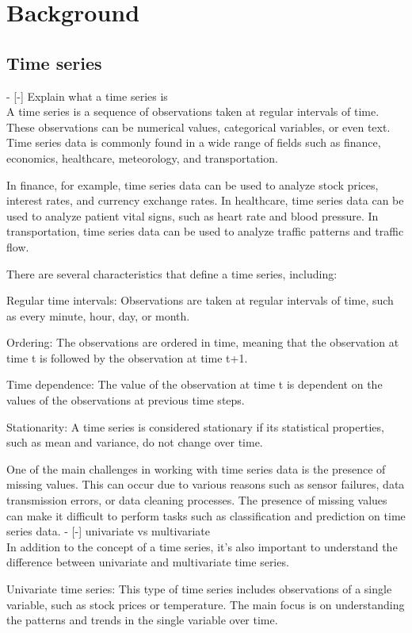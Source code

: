 \section{Background}

\subsection{Time series}
- [-] Explain what a time series is\\
A time series is a sequence of observations taken at regular intervals of time. These observations can be numerical values, categorical variables, or even text. Time series data is commonly found in a wide range of fields such as finance, economics, healthcare, meteorology, and transportation.

In finance, for example, time series data can be used to analyze stock prices, interest rates, and currency exchange rates. In healthcare, time series data can be used to analyze patient vital signs, such as heart rate and blood pressure. In transportation, time series data can be used to analyze traffic patterns and traffic flow.

There are several characteristics that define a time series, including:

Regular time intervals: Observations are taken at regular intervals of time, such as every minute, hour, day, or month.

Ordering: The observations are ordered in time, meaning that the observation at time t is followed by the observation at time t+1.

Time dependence: The value of the observation at time t is dependent on the values of the observations at previous time steps.

Stationarity: A time series is considered stationary if its statistical properties, such as mean and variance, do not change over time.

One of the main challenges in working with time series data is the presence of missing values. This can occur due to various reasons such as sensor failures, data transmission errors, or data cleaning processes. The presence of missing values can make it difficult to perform tasks such as classification and prediction on time series data.
- [-] univariate vs multivariate\\
In addition to the concept of a time series, it's also important to understand the difference between univariate and multivariate time series.

Univariate time series: This type of time series includes observations of a single variable, such as stock prices or temperature. The main focus is on understanding the patterns and trends in the single variable over time.

